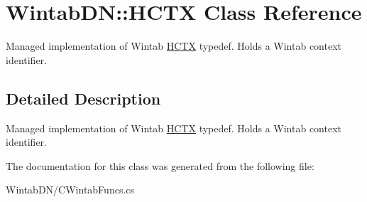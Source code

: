 \hypertarget{class_wintab_d_n_1_1_h_c_t_x}{
\section{WintabDN::HCTX Class Reference}
\label{class_wintab_d_n_1_1_h_c_t_x}
}


Managed implementation of Wintab \hyperlink{class_wintab_d_n_1_1_h_c_t_x}{HCTX} typedef. Holds a Wintab context identifier.  




\subsection{Detailed Description}
Managed implementation of Wintab \hyperlink{class_wintab_d_n_1_1_h_c_t_x}{HCTX} typedef. Holds a Wintab context identifier. 

The documentation for this class was generated from the following file:\begin{DoxyCompactItemize}
\item 
WintabDN/CWintabFuncs.cs\end{DoxyCompactItemize}
